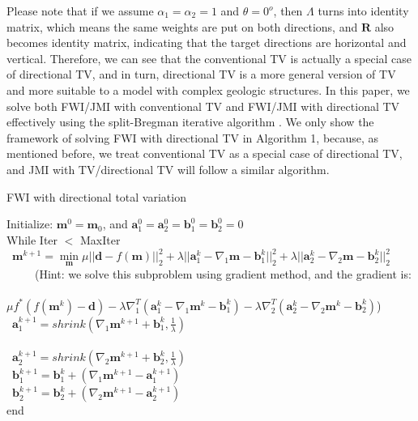 Please note that if we assume $\alpha_1 = \alpha_2 = 1$ and $\theta = 0^o$, then $\Lambda$ turns into  identity matrix, which means the same weights are put on both directions, and $\mathbf{R}$ also becomes  identity matrix, indicating that the target directions are horizontal and vertical. Therefore, we can see that the conventional TV is actually a special case of  directional TV, and in turn,  directional TV is a more general version of  TV and more suitable to a model with complex geologic structures. In this paper, we solve both FWI/JMI with  conventional TV and FWI/JMI with  directional TV effectively using the split-Bregman iterative algorithm \citep{goldstein2009split}. We only show the framework of solving FWI with  directional TV in Algorithm 1, because, as mentioned before, we treat  conventional TV as a special case of directional  TV, and JMI with  TV/directional TV will follow a similar algorithm.

\begin{algorithm}
\caption{FWI with directional total variation}
\begin{algorithmic}[1]
  \scriptsize
  \STATE Initialize: $\mathbf{m}^0=\mathbf{m}_0$, and $\mathbf{a}_1^0=\mathbf{a}_2^0=\mathbf{b}_1^0=\mathbf{b}_2^0=0$\\
  \STATE While Iter $<$ MaxIter \\
  ~$\mathbf{m}^{k+1}=\min\limits_\mathbf{m} \mu || \mathbf{d} - f\left(\mathbf{m}\right) ||_2^2 + \lambda|| \mathbf{a}_1^k-\nabla_1 \mathbf{m}-\mathbf{b}_1^k||_2^2 + \lambda|| \mathbf{a}_2^k-\nabla_2 \mathbf{m}-\mathbf{b}_2^k||_2^2$  \\
  ~~~~~(Hint: we solve this subproblem using gradient method, and the gradient is: \\
  ~~~~~~~~$\mu f^{*} \left( f\left(\mathbf{m}^{k}\right) - \mathbf{d} \right) - \lambda \nabla^{T}_1 \left( \mathbf{a}_1^k-\nabla_1 \mathbf{m}^{k}-\mathbf{b}_1^k \right) - \lambda \nabla^{T}_2 \left( \mathbf{a}_2^k-\nabla_2 \mathbf{m}^{k}-\mathbf{b}_2^k \right)$) \\
  ~$\mathbf{a}_1^{k+1}=shrink\left(\nabla_1 \mathbf{m}^{k+1}+\mathbf{b}_1^k, \frac{1}{\lambda}\right)$ \\
   \\
  
  ~$\mathbf{a}_2^{k+1}=shrink\left(\nabla_2 \mathbf{m}^{k+1}+\mathbf{b}_2^k, \frac{1}{\lambda}\right)$ \\
  ~$\mathbf{b}_1^{k+1}=\mathbf{b}_1^{k} + \left(\nabla_1 \mathbf{m}^{k+1}-\mathbf{a}_1^{k+1}\right)$  \\
  ~$\mathbf{b}_2^{k+1}=\mathbf{b}_2^{k} + \left(\nabla_2 \mathbf{m}^{k+1}-\mathbf{a}_2^{k+1}\right)$  \\
  end
\end{algorithmic}
\end{algorithm}

